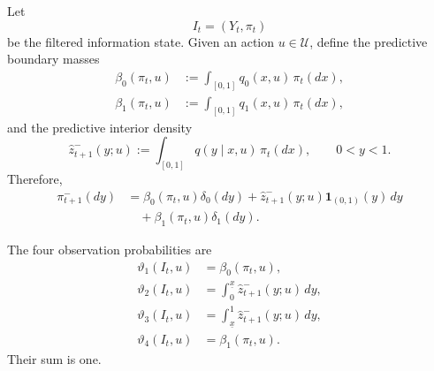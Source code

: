 \documentclass[10pt,twocolumn]{article}
\theoremstyle{remark}
\newcommand{\Ucal}{\mathcal{U}}
\newcommand{\one}{\mathbf{1}}
\begin{document}
Let
\[
I_t=(Y_t,\pi_t)
\]
be the filtered information state. Given an action \(u\in\Ucal\), define the predictive boundary masses
\begin{align}
	\beta_0(\pi_t,u)
	&:=
	\int_{[0,1]}q_0(x,u)\,\pi_t(dx),
	\label{eq:predictive-lower-mass}
	\\
	\beta_1(\pi_t,u)
	&:=
	\int_{[0,1]}q_1(x,u)\,\pi_t(dx),
	\label{eq:predictive-upper-mass}
\end{align}
and the predictive interior density
\begin{equation}
	\widehat z_{t+1}^{-}(y;u)
	:=
	\int_{[0,1]}
	q(y\mid x,u)\,\pi_t(dx),
	\qquad 0<y<1.
	\label{eq:predictive-interior-density}
\end{equation}
Therefore,
\begin{equation*}
	\begin{aligned}
		\pi_{t+1}^{-}(dy)
		&=
		\beta_0(\pi_t,u)\delta_0(dy)
		+
		\widehat z_{t+1}^{-}(y;u)\one_{(0,1)}(y)\,dy
		\\
		&\quad+
		\beta_1(\pi_t,u)\delta_1(dy).
	\end{aligned}
	\label{eq:reference-predictive-measure}
\end{equation*}

The four observation probabilities are
\begin{align}
	\vartheta_1(I_t,u)
	&=
	\beta_0(\pi_t,u),
	\label{eq:reference-observation-probability-1}
	\\
	\vartheta_2(I_t,u)
	&=
	\int_0^{\underline x}
	\widehat z_{t+1}^{-}(y;u)\,dy,
	\label{eq:reference-observation-probability-2}
	\\
	\vartheta_3(I_t,u)
	&=
	\int_{\underline x}^{1}
	\widehat z_{t+1}^{-}(y;u)\,dy,
	\label{eq:reference-observation-probability-3}
	\\
	\vartheta_4(I_t,u)
	&=
	\beta_1(\pi_t,u).
	\label{eq:reference-observation-probability-4}
\end{align}
Their sum is one.
\end{document}
